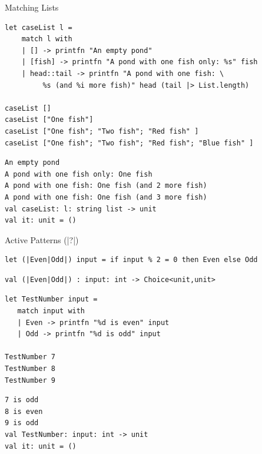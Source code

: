 \documentclass[t]{beamer}
\begin{document}
\begin{frame}[label={sec:org30caa54},fragile]{Matching Lists}
 \begin{verbatim}
let caseList l = 
    match l with
    | [] -> printfn "An empty pond" 
    | [fish] -> printfn "A pond with one fish only: %s" fish 
    | head::tail -> printfn "A pond with one fish: \
         %s (and %i more fish)" head (tail |> List.length)

caseList []
caseList ["One fish"]
caseList ["One fish"; "Two fish"; "Red fish" ]
caseList ["One fish"; "Two fish"; "Red fish"; "Blue fish" ]
\end{verbatim}

\begin{verbatim}
An empty pond
A pond with one fish only: One fish
A pond with one fish: One fish (and 2 more fish)
A pond with one fish: One fish (and 3 more fish)
val caseList: l: string list -> unit
val it: unit = ()
\end{verbatim}
\end{frame}

\begin{frame}[label={sec:orgecef492},fragile]{Active Patterns (|?|)}
 \scriptsize
\begin{verbatim}
let (|Even|Odd|) input = if input % 2 = 0 then Even else Odd
\end{verbatim}

\begin{verbatim}
val (|Even|Odd|) : input: int -> Choice<unit,unit>
\end{verbatim}


\begin{verbatim}
let TestNumber input =
   match input with
   | Even -> printfn "%d is even" input
   | Odd -> printfn "%d is odd" input

TestNumber 7
TestNumber 8
TestNumber 9
\end{verbatim}

\begin{verbatim}
7 is odd
8 is even
9 is odd
val TestNumber: input: int -> unit
val it: unit = ()
\end{verbatim}
\end{frame}
\end{document}
